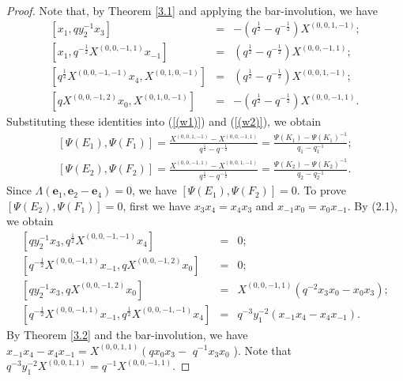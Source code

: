 \documentclass[reqno,11pt]{amsart}
\numberwithin{equation}{section}
\begin{document}
\begin{proof}
Note that, by Theorem \ref{3.1} and applying the bar-involution, we have
\begin{eqnarray*}
	{\left[x_1, q y_2^{-1} x_3\right] } & =&-\left(q^{\frac{1}{2}}-q^{-\frac{1}{2}}\right) X^{(0,0,1,-1)}; \\
	{\left[x_1, q^{-\frac{1}{2}} X^{(0,0,-1,1)} x_{-1}\right] } & =&\left(q^{\frac{1}{2}}-q^{-\frac{1}{2}}\right) X^{(0,0,-1,1)}; \\
	{\left[q^{\frac{1}{2}} X^{(0,0,-1,-1)} x_4, X^{(0,1,0,-1)}\right] } & =&\left(q^{\frac{1}{2}}-q^{-\frac{1}{2}}\right) X^{(0,0,1,-1)}; \\
	{\left[q X^{(0,0,-1,2)} x_0, X^{(0,1,0,-1)}\right] } & =&-\left(q^{\frac{1}{2}}-q^{-\frac{1}{2}}\right) X^{(0,0,-1,1)} .
\end{eqnarray*}
Substituting these identities into (\ref{(w1)}) and (\ref{(w2)}), we obtain
\begin{eqnarray*}
\left[\Psi\left(E_1\right), \Psi\left(F_1\right)\right]=\frac{X^{(0,0,1,-1)}-X^{(0,0,-1,1)}}{q^{\frac{1}{2}}-q^{-\frac{1}{2}}}=\frac{\Psi\left(K_1\right)-\Psi\left(K_1\right)^{-1}}{q_1-q_1^{-1}};\\
\left[\Psi\left(E_2\right), \Psi\left(F_2\right)\right]=\frac{X^{(0,0,-1,1)}-X^{(0,0,1,-1)}}{q^{\frac{1}{2}}-q^{-\frac{1}{2}}}=\frac{\Psi\left(K_2\right)-\Psi\left(K_2\right)^{-1}}{q_2-q_2^{-1}} .
\end{eqnarray*}
Since $\Lambda\left(\mathbf{e}_1, \mathbf{e}_2-\mathbf{e}_4\right)=0$, we have $\left[\Psi\left(E_1\right), \Psi\left(F_2\right)\right]=0$. To prove $\left[\Psi\left(E_2\right), \Psi\left(F_1\right)\right]=0$, first we have $x_3 x_4=x_4 x_3$ and $x_{-1} x_0=x_0 x_{-1}$. By (2.1), we obtain
\begin{eqnarray*}
	{\left[q y_2^{-1} x_3, q^{\frac{1}{2}} X^{(0,0,-1,-1)} x_4\right] } & =&0; \\
	{\left[q^{-\frac{1}{2}} X^{(0,0,-1,1)} x_{-1}, q X^{(0,0,-1,2)} x_0\right] } & =&0; \\
	{\left[q y_2^{-1} x_3, q X^{(0,0,-1,2)} x_0\right] } & =&X^{(0,0,-1,1)}\left(q^{-2} x_3 x_0-x_0 x_3\right); \\
	{\left[q^{-\frac{1}{2}} X^{(0,0,-1,1)} x_{-1}, q^{\frac{1}{2}} X^{(0,0,-1,-1)} x_4\right] } & =&q^{-3} y_1^{-2}\left(x_{-1} x_4-x_4 x_{-1}\right) .
\end{eqnarray*}
By Theorem \ref{3.2} and the bar-involution, we have $x_{-1} x_4-x_4 x_{-1}=X^{(0,0,1,1)}\left(q x_0 x_3-\right.$ $q^{-1} x_3 x_0$ ). Note that $q^{-3} y_1^{-2} X^{(0,0,1,1)}=q^{-1} X^{(0,0,-1,1)}$.


\end{proof}
\end{document}
